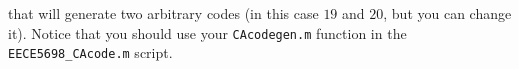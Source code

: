 \documentclass[11pt]{article}
\begin{document}
% 
% 
% 
% 
% 
% 

that will generate two arbitrary codes (in this case $19$ and $20$, but you can change it). Notice that you should use your \verb|CAcodegen.m| function in the \verb|EECE5698_CAcode.m| script. 
\end{document}

